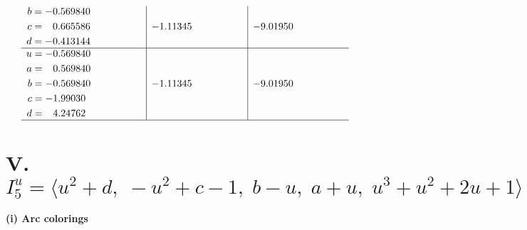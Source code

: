 \documentclass[1p]{elsarticle_modified}
\theoremstyle{definition}
\begin{document}
$$\begin{array}{c|c|c}
\begin{aligned}
b &= -0.569840\phantom{ +0.000000I} \\
c &= \phantom{-}0.665586\phantom{ +0.000000I} \\
d &= -0.413144\phantom{ +0.000000I}\end{aligned}
 & -1.11345\phantom{ +0.000000I} & -9.01950\phantom{ +0.000000I} \\ \hline\begin{aligned}
u &= -0.569840\phantom{ +0.000000I} \\
a &= \phantom{-}0.569840\phantom{ +0.000000I} \\
b &= -0.569840\phantom{ +0.000000I} \\
c &= -1.99030\phantom{ +0.000000I} \\
d &= \phantom{-}4.24762\phantom{ +0.000000I}\end{aligned}
 & -1.11345\phantom{ +0.000000I} & -9.01950\phantom{ +0.000000I}\\
 \hline 
 \end{array}$$\newpage\newpage\renewcommand{\arraystretch}{1}
\centering \section*{V. $I^u_{5}= \langle u^2+d,\;- u^2+c-1,\;b- u,\;a+u,\;u^3+u^2+2 u+1 \rangle$}
\flushleft \textbf{(i) Arc colorings}\\
\end{document}
